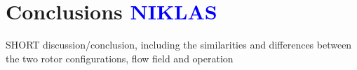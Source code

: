 \chapter{Conclusions \textcolor{blue}{NIKLAS}}

SHORT discussion/conclusion, including the similarities and differences between the two rotor configurations, flow field and operation